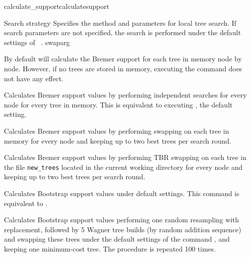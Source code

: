 \begin{command}{calculate\_support}{calculatesupport}
\begin{arguments}
\begin{argumentgroup}{Search strategy}
                {Specifies the method and parameters for local tree search. If
                search parameters are not specified, the search is performed under
                the default settings of ~.} 
                {swaparg}
         
        \end{argumentgroup}

    \end{arguments}

        {By default \poy will calculate the Bremer support for each tree in memory 
        node by node.  However, if no trees are stored in memory, executing the
        command  does not have any effect.}
    
    \begin{poyexamples} 

            {Calculates Bremer support values by performing
            independent searches for every node for every tree in memory. 
            This is equivalent to executing , the default setting.}
         
            {Calculates Bremer support values by performing swapping on 
            each tree in memory for every node and keeping up to two
            best trees per search round.}
          
            {Calculates Bremer support values by performing TBR swapping on 
            each tree in the file \texttt{new\_trees} located in the current
            working directory for every node and keeping up to two
            best trees per search round.}  
            
            {Calculates Bootstrap support values under default settings. This command
            is equivalent to .}
    
            {Calculates Bootstrap support values performing one random resampling with
            replacement, followed by 5 Wagner tree builds (by random addition sequence)
            and swapping these trees under the default settings of the command 
            , and keeping one minimum-cost tree. The procedure
            is repeated 100 times.}
        

\end{poyexamples}
\end{command}
